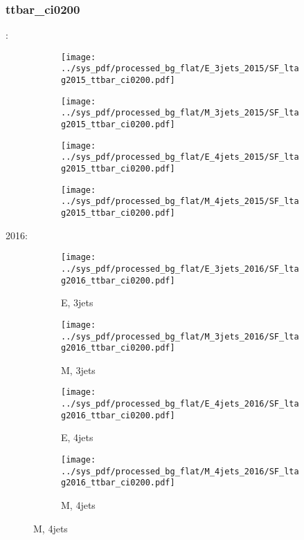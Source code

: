 \documentclass{beamer}
\begin{document}
\begin{frame}
\frametitle{ttbar_ci0200}
\fontsize{5}{1}:
\begin{figure}
\centering
\begin{subfigure}[b]{0.24\textwidth}
\texttt{[image: ../sys\_pdf/processed\_bg\_flat/E\_3jets\_2015/SF\_ltag2015\_ttbar\_ci0200.pdf]}
\end{subfigure}
\begin{subfigure}[b]{0.24\textwidth}
\texttt{[image: ../sys\_pdf/processed\_bg\_flat/M\_3jets\_2015/SF\_ltag2015\_ttbar\_ci0200.pdf]}
\end{subfigure}
\begin{subfigure}[b]{0.24\textwidth}
\texttt{[image: ../sys\_pdf/processed\_bg\_flat/E\_4jets\_2015/SF\_ltag2015\_ttbar\_ci0200.pdf]}
\end{subfigure}
\begin{subfigure}[b]{0.24\textwidth}
\texttt{[image: ../sys\_pdf/processed\_bg\_flat/M\_4jets\_2015/SF\_ltag2015\_ttbar\_ci0200.pdf]}
\end{subfigure}
\end{figure}
2016:
\begin{figure}
\centering
\begin{subfigure}[b]{0.24\textwidth}
\texttt{[image: ../sys\_pdf/processed\_bg\_flat/E\_3jets\_2016/SF\_ltag2016\_ttbar\_ci0200.pdf]}
\captionsetup{font=tiny}
\caption{E, 3jets}
\end{subfigure}
\begin{subfigure}[b]{0.24\textwidth}
\texttt{[image: ../sys\_pdf/processed\_bg\_flat/M\_3jets\_2016/SF\_ltag2016\_ttbar\_ci0200.pdf]}
\captionsetup{font=tiny}
\caption{M, 3jets}
\end{subfigure}
\begin{subfigure}[b]{0.24\textwidth}
\texttt{[image: ../sys\_pdf/processed\_bg\_flat/E\_4jets\_2016/SF\_ltag2016\_ttbar\_ci0200.pdf]}
\captionsetup{font=tiny}
\caption{E, 4jets}
\end{subfigure}
\begin{subfigure}[b]{0.24\textwidth}
\texttt{[image: ../sys\_pdf/processed\_bg\_flat/M\_4jets\_2016/SF\_ltag2016\_ttbar\_ci0200.pdf]}
\captionsetup{font=tiny}
\caption{M, 4jets}
\end{subfigure}
\end{figure}
\end{frame}
\end{document}
